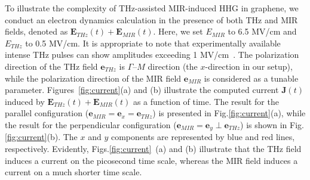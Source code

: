 To illustrate the complexity of THz-assisted MIR-induced \gls{HHG} in graphene, we conduct an electron dynamics calculation in the presence of both THz and MIR fields, denoted as $\mathbf E_{THz}(t) + \mathbf E_{MIR}(t)$. Here, we set $E_{MIR}$ to 6.5 MV/cm and $E_{THz}$ to 0.5 MV/cm. It is appropriate to note that experimentally available intense THz pulses can show amplitudes exceeding 1 MV/cm~\cite{10.1063/1.3560062}. The polarization direction of the THz field $\mathbf e_{THz}$ is $\Gamma$--$M$ direction (the $x$-direction in our setup), while the polarization direction of the MIR field $\mathbf e_{MIR}$ is considered as a tunable parameter. Figures~\ref{fig:current}(a) and (b) illustrate the computed current $\mathbf J(t)$ induced by $\mathbf E_{THz}(t) + \mathbf E_{MIR}(t)$ as a function of time. The result for the parallel configuration ($\mathbf e_{MIR} = \mathbf e_x = \mathbf e_{THz}$) is presented in Fig.\ref{fig:current}(a), while the result for the perpendicular configuration ($\mathbf e_{MIR} = \mathbf e_y \perp \mathbf e_{THz}$) is shown in Fig.\ref{fig:current}(b). The $x$ and $y$ components are represented by blue and red lines, respectively. Evidently, Figs.\ref{fig:current}~(a) and (b) illustrate that the THz field induces a current on the picosecond time scale, whereas the MIR field induces a current on a much shorter time scale.
